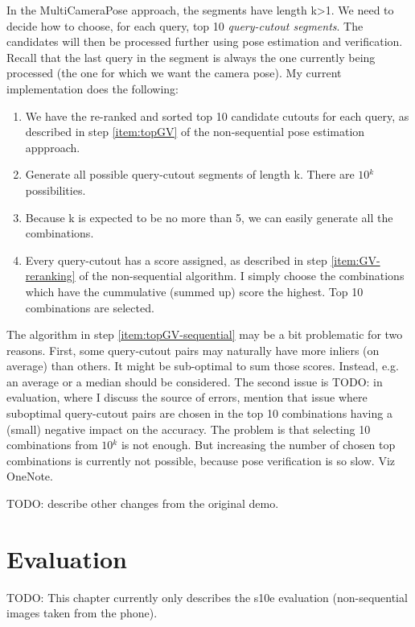 \documentclass[twoside]{ctuthesis}
\theoremstyle{plain}
\theoremstyle{definition}
\theoremstyle{note}
\newcommand{\topGV}{10} %
\newcommand{\topPE}{10} %
\begin{document}
In the MultiCameraPose approach, the segments have length k>1. We need to decide how to choose, for each query, top \topPE{} \emph{query-cutout segments}. The candidates will then be processed further using pose estimation and verification. Recall that the last query in the segment is always the one currently being processed (the one for which we want the camera pose). My current implementation does the following:

\begin{enumerate}
	\item We have the re-ranked and sorted top \topGV{} candidate cutouts for each query, as described in step \ref{item:topGV} of the non-sequential pose estimation appproach.
	\item Generate all possible query-cutout segments of length k. There are $\topGV{}^{k}$ possibilities.
	\item Because k is expected to be no more than 5, we can easily generate all the combinations.
	\item \label{item:topGV-sequential} Every query-cutout has a score assigned, as described in step \ref{item:GV-reranking} of the non-sequential algorithm. I simply choose the combinations which have the cummulative (summed up) score the highest. Top \topPE{} combinations are selected.
\end{enumerate}

The algorithm in step \ref{item:topGV-sequential} may be a bit problematic for two reasons. First, some query-cutout pairs may naturally have more inliers (on average) than others. It might be sub-optimal to sum those scores. Instead, e.g. an average or a median should be considered. The second issue is TODO: in evaluation, where I discuss the source of errors, mention that issue where suboptimal query-cutout pairs are chosen in the top \topPE{} combinations having a (small) negative impact on the accuracy. The problem is that selecting \topPE{} combinations from $\topGV{}^{k}$ is not enough. But increasing the number of chosen top combinations is currently not possible, because pose verification is so slow. Viz OneNote.

TODO: describe other changes from the original demo.

\chapter{Evaluation}

TODO: This chapter currently only describes the s10e evaluation (non-sequential images taken from the phone).
\end{document}
